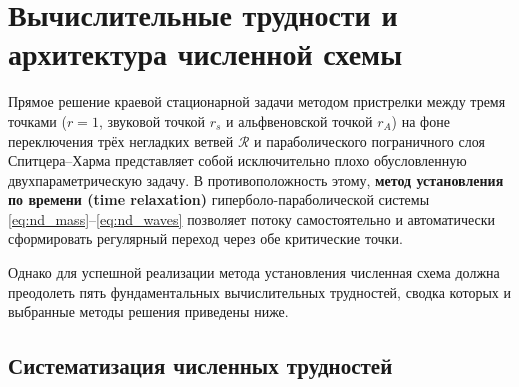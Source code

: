 \documentclass[11pt,a4paper]{article}
\begin{document}
\section{Вычислительные трудности и архитектура численной схемы}

Прямое решение краевой стационарной задачи методом пристрелки между тремя точками ($r = 1$, звуковой точкой $r_s$ и альфвеновской точкой $r_A$) на фоне переключения трёх негладких ветвей $\mathcal{R}$ и параболического пограничного слоя Спитцера--Харма представляет собой исключительно плохо обусловленную двухпараметрическую задачу. В противоположность этому, \textbf{метод установления по времени (time relaxation)} гиперболо-параболической системы \eqref{eq:nd_mass}--\eqref{eq:nd_waves} позволяет потоку самостоятельно и автоматически сформировать регулярный переход через обе критические точки.

Однако для успешной реализации метода установления численная схема должна преодолеть пять фундаментальных вычислительных трудностей, сводка которых и выбранные методы решения приведены ниже.

\subsection{Систематизация численных трудностей}
\end{document}
